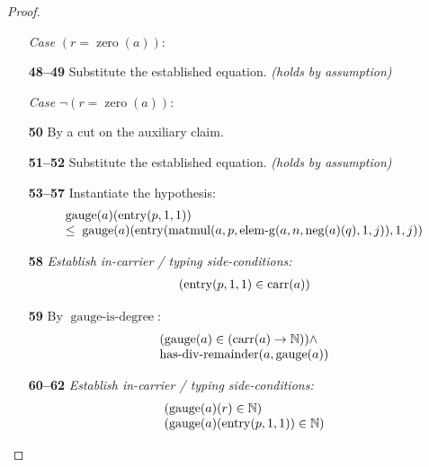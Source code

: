 \documentclass[11pt]{article}
\theoremstyle{plain}
\begin{document}
\begin{proof}
\begin{itemize}[leftmargin=2.8em, itemsep=4pt, parsep=1pt]
  \item[]\emph{Case} $(r = \operatorname{zero}(a))$:
  \item[\textbf{48--49}] Substitute the established equation.  \emph{(holds by assumption)}
  \item[]\emph{Case} $\lnot (r = \operatorname{zero}(a))$:
  \item[\textbf{50}] By a cut on the auxiliary claim.
  \item[\textbf{51--52}] Substitute the established equation.  \emph{(holds by assumption)}
  \item[\textbf{53--57}] Instantiate the hypothesis:
\begin{equation*}
\begin{array}{@{}l@{}} \operatorname{gauge}(a)(\operatorname{entry}(p, 1, 1)) \\ \leq\; \operatorname{gauge}(a)(\operatorname{entry}(\operatorname{matmul}(a, p, \operatorname{elem\text{-}g}(a, n, \operatorname{neg}(a)(q), 1, j)), 1, j)) \end{array}
\end{equation*}

  \item[\textbf{58}] \emph{Establish in-carrier / typing side-conditions:}
\begin{equation*}
\begin{array}{@{}l@{}}
(\operatorname{entry}(p, 1, 1) \in \operatorname{carr}(a))
\end{array}
\end{equation*}

  \item[\textbf{59}] By $\operatorname{gauge\text{-}is\text{-}degree}$:
\begin{equation*}
\begin{array}{@{}l@{}} (\operatorname{gauge}(a) \in (\operatorname{carr}(a) \to \mathbb{N})) \wedge \\ \operatorname{has\text{-}div\text{-}remainder}(a, \operatorname{gauge}(a)) \end{array}
\end{equation*}

  \item[\textbf{60--62}] \emph{Establish in-carrier / typing side-conditions:}
\begin{equation*}
\begin{array}{@{}l@{}}
(\operatorname{gauge}(a)(r) \in \mathbb{N}) \\
(\operatorname{gauge}(a)(\operatorname{entry}(p, 1, 1)) \in \mathbb{N})
\end{array}
\end{equation*}


\end{itemize}
\end{proof}
\end{document}

